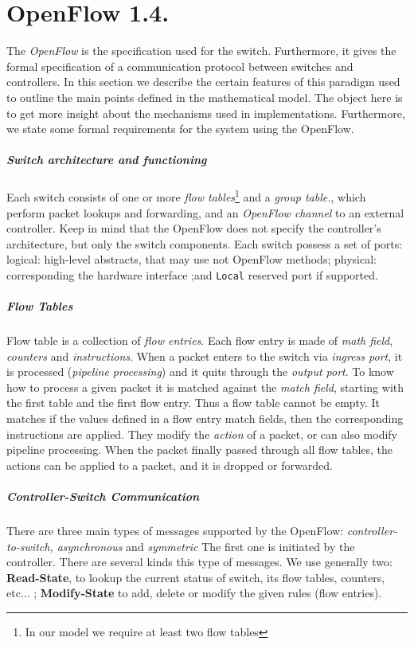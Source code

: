 \documentclass{article}
\theoremstyle{remark}
\begin{document}
\section{OpenFlow 1.4.}
The \emph{OpenFlow} is the specification used for the switch. Furthermore, it gives the formal specification of a communication protocol between switches and controllers. In this section we describe the certain features of this paradigm used to outline the main points defined in the mathematical model. The object here is to get more insight about the mechanisms used in implementations. Furthermore, we state some formal requirements for the system using the OpenFlow.
\subparagraph{Switch architecture and functioning} Each switch consists of one or more \emph{flow tables}\footnote{In our model we require at least two flow tables} and a \emph{group table.}, which perform packet lookups and forwarding, and an \emph{OpenFlow channel} to an external controller\cite{OpenFlow}. Keep in mind that the OpenFlow does not specify the controller's architecture, but only the switch components. 
Each switch possess a set of ports: logical: high-level abstracts, that may use not OpenFlow methods; physical: corresponding the hardware interface ;and \texttt{Local} reserved port if supported. 
\subparagraph{Flow Tables} Flow table is a collection of \emph{flow entries}. Each flow entry is made of \emph{math field}, \emph{counters} and \emph{instructions}. When a packet enters to the switch via \emph{ingress port}, it is processed (\emph{pipeline processing}) and it quits through the \emph{output port}.
To know how to process a given packet it is matched against the \emph{match field}, starting with the first table and the first flow entry. Thus a flow table cannot be empty. It matches if the values defined in a flow entry match fields, then the corresponding instructions are applied. They modify the \emph{action} of a packet, or can also modify pipeline processing. When the packet finally passed through all flow tables, the actions can be applied to a packet, and it is dropped or forwarded. 
\subparagraph{Controller-Switch Communication} There are three main types of messages supported by the OpenFlow: \emph{controller-to-switch, asynchronous} and \emph{symmetric}
The first one is initiated by the controller. There are several kinds this type of messages. We use generally two: \textbf{Read-State}, to lookup the current status of switch, its flow tables, counters, etc... ; \textbf{Modify-State} to add, delete or modify the given rules (flow entries).
\end{document}
